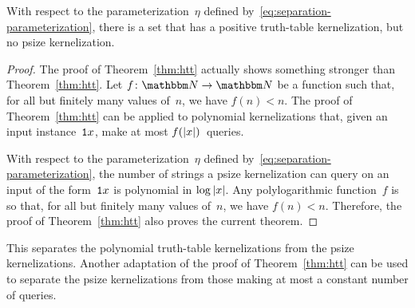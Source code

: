 \begin{theorem}
  With respect to the parameterization~$\eta$ defined by~\eqref{eq:separation-parameterization}, there is a set that has a positive truth-table kernelization, but no psize kernelization.
\end{theorem}
\begin{proof}
  The proof of Theorem~\ref{thm:htt} actually shows something stronger than Theorem~\ref{thm:htt}.
  Let $f\colon \bbN \to \bbN$ be a function such that, for all but finitely many values of~$n$, we have $f(n) < n$.
  The proof of Theorem~\ref{thm:htt} can be applied to polynomial kernelizations that, given an input instance~$\textnormal{\texttt{1}}x$, make at most $f({\lvert x\rvert})$~queries.

  With respect to the parameterization~$\eta$ defined by~\eqref{eq:separation-parameterization}, the number of strings a psize kernelization can query on an input of the form~$\textnormal{\texttt{1}}x$ is polynomial in $\log {\lvert x\rvert}$.
  Any polylogarithmic function~$f$ is so that, for all but finitely many values of~$n$, we have $f(n) < n$.
  Therefore, the proof of Theorem~\ref{thm:htt} also proves the current theorem.
\end{proof}

This separates the polynomial truth-table kernelizations from the psize kernelizations.
Another adaptation of the proof of Theorem~\ref{thm:htt} can be used to separate the psize kernelizations from those making at most a constant number of queries.

